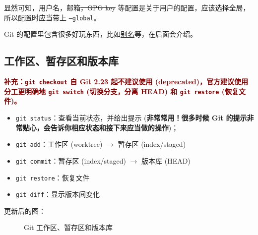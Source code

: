 \documentclass{article}
\begin{document}
	显然可知，用户名，邮箱\sout{，GPG key} 等配置是关于用户的配置，应该选择全局，所以配置时应当带上 \texttt{--global}。

	Git 的配置里包含很多好玩东西，比如\hyperref[sss:gitalias]{别名}等，在后面会介绍。

	\subsection{工作区、暂存区和版本库}

	\textcolor{maroon}{\textbf{补充：\texttt{git checkout} 自 Git 2.23 起不建议使用 (deprecated)，官方建议使用分工更明确地 \texttt{git switch} (切换分支，分离 HEAD) 和 \texttt{git restore} (恢复文件)。}}

	\begin{itemize}
		\itemsep0pt
		\item \texttt{git status}：查看当前状态，并给出提示 (\textbf{\color{red}非常常用！很多时候 Git 的提示非常贴心，会告诉你相应状态和接下来应当做的操作})；
		\item \texttt{git add}：工作区 (worktree) $\to$ 暂存区 (index/staged)
		\item \texttt{git commit}：暂存区 (index/staged) $\to$ 版本库 (HEAD)
		\item \texttt{git restore}：恢复文件
		\item \texttt{git diff}：显示版本间变化
	\end{itemize}

	更新后的图：
	\begin{figure}[htbp]
		\centering
		\caption{Git 工作区、暂存区和版本库}
	\end{figure}
\end{document}
